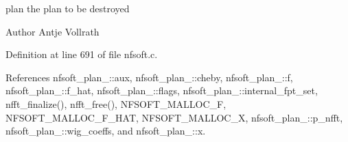 \begin{DoxyItemize}
\item plan the plan to be destroyed\end{DoxyItemize}
\begin{DoxyAuthor}{Author}
Antje Vollrath 
\end{DoxyAuthor}


Definition at line 691 of file nfsoft.\-c.



References nfsoft\-\_\-plan\-\_\-\-::aux, nfsoft\-\_\-plan\-\_\-\-::cheby, nfsoft\-\_\-plan\-\_\-\-::f, nfsoft\-\_\-plan\-\_\-\-::f\-\_\-hat, nfsoft\-\_\-plan\-\_\-\-::flags, nfsoft\-\_\-plan\-\_\-\-::internal\-\_\-fpt\-\_\-set, nfft\-\_\-finalize(), nfft\-\_\-free(), N\-F\-S\-O\-F\-T\-\_\-\-M\-A\-L\-L\-O\-C\-\_\-\-F, N\-F\-S\-O\-F\-T\-\_\-\-M\-A\-L\-L\-O\-C\-\_\-\-F\-\_\-\-H\-A\-T, N\-F\-S\-O\-F\-T\-\_\-\-M\-A\-L\-L\-O\-C\-\_\-\-X, nfsoft\-\_\-plan\-\_\-\-::p\-\_\-nfft, nfsoft\-\_\-plan\-\_\-\-::wig\-\_\-coeffs, and nfsoft\-\_\-plan\-\_\-\-::x.

